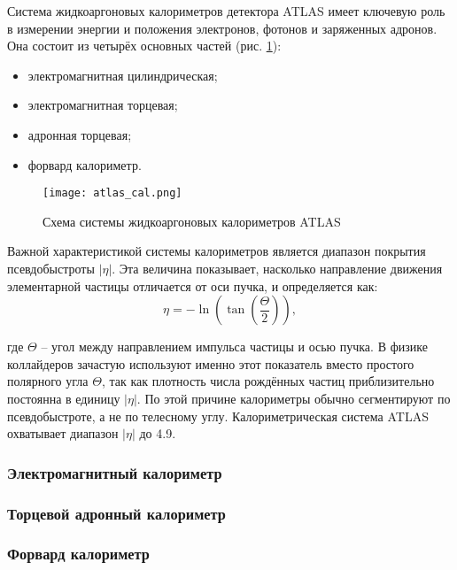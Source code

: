 Система жидкоаргоновых калориметров детектора ATLAS имеет ключевую роль в измерении энергии и положения электронов, фотонов и заряженных адронов. Она состоит из четырёх основных частей \parencite{tdr_green} (рис. \ref{fig:atlas_cal}):
\begin {itemize}
    \item электромагнитная цилиндрическая;
    \item электромагнитная торцевая;
    \item адронная торцевая;
    \item форвард калориметр.
\end{itemize}\par
\begin{figure}[ht]
    \centering
    \texttt{[image: atlas\_cal.png]}
    \caption{Схема системы жидкоаргоновых калориметров ATLAS}
    \label{fig:atlas_cal}
\end{figure}
Важной характеристикой системы калориметров является диапазон покрытия псевдобыстроты $|\eta|$. Эта величина показывает, насколько направление движения элементарной частицы отличается от оси пучка, и определяется как:
\begin{equation}
    \eta = -\ln(\tan(\frac{\Theta}{2})),
\end{equation}\par
где $\Theta$ -- угол между направлением импульса частицы и осью пучка. В физике коллайдеров зачастую используют именно этот показатель вместо простого полярного угла $\Theta$, так как плотность числа рождённых частиц приблизительно постоянна в единицу $|\eta|$. По этой причине калориметры обычно сегментируют по псевдобыстроте, а не по телесному углу. Калориметрическая система ATLAS охватывает диапазон $|\eta|$ до 4.9.

\subsubsection{Электромагнитный калориметр}


\subsubsection{Торцевой адронный калориметр}


\subsubsection{Форвард калориметр}

